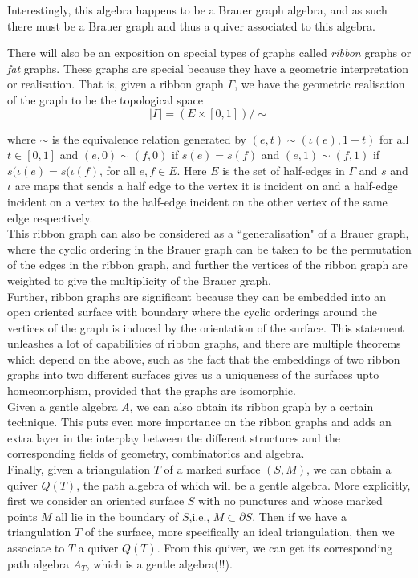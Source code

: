 \documentclass{report}
\theoremstyle{definition}
\numberwithin{figure}{section}
\begin{document}
Interestingly, this algebra happens to be a Brauer graph algebra, and as such there must be a Brauer graph and thus a quiver associated to this algebra.

There will also be an exposition on special types of graphs called \textit{ribbon} graphs or \textit{fat} graphs. These graphs are special because they have a geometric interpretation or realisation. That is, given a ribbon graph $\Gamma$, we have the geometric realisation of the graph to be the topological space
\[
|\Gamma|=(E \times [0,1])/ \sim
\]

where $\sim$ is the equivalence relation generated by $(e,t) \sim (\iota(e), 1-t)$ for all $t\in [0,1]$ and $(e,0) \sim (f,0)$ if $s(e)=s(f)$ and $(e,1)\sim (f,1)$ if $s(\iota(e)=s(\iota(f)$, for all $e,f \in E$. Here $E$ is the set of half-edges in $\Gamma$ and $s$ and $\iota$ are maps that sends a half edge to the vertex it is incident on and a half-edge incident on a vertex to the half-edge incident on the other vertex of the same edge respectively.\\

This ribbon graph can also be considered as a ``generalisation" of a Brauer graph, where the cyclic ordering in the Brauer graph can be taken to be the permutation of the edges in the ribbon graph, and further the vertices of the ribbon graph are weighted to give the multiplicity of the Brauer graph. \\

Further, ribbon graphs are significant because they can be embedded into an open oriented surface with boundary where the cyclic orderings around the vertices of the graph is induced by the orientation of the surface. This statement unleashes a lot of capabilities of ribbon graphs, and there are multiple theorems which depend on the above, such as the fact that the embeddings of two ribbon graphs into two different surfaces gives us a uniqueness of the surfaces upto homeomorphism, provided that the graphs are isomorphic.  \\

Given a gentle algebra $A$, we can also obtain its ribbon graph by a certain technique. This puts even more importance on the ribbon graphs and adds an extra layer in the interplay between the different structures and the corresponding fields of geometry, combinatorics and algebra.\\

Finally, given a triangulation $T$ of a marked surface $(S,M)$, we can obtain a quiver $Q(T)$, the path algebra of which will be a gentle algebra. More explicitly, first we consider an oriented surface $S$ with no punctures and whose marked points $M$ all lie in the boundary of $S$,i.e., $M\subset \partial S$. Then if we have a triangulation $T$ of the surface, more specifically an ideal triangulation, then we associate to $T$ a quiver $Q(T)$. From this quiver, we can get its corresponding path algebra $A_T$, which is a gentle algebra(!!).\\
\end{document}
